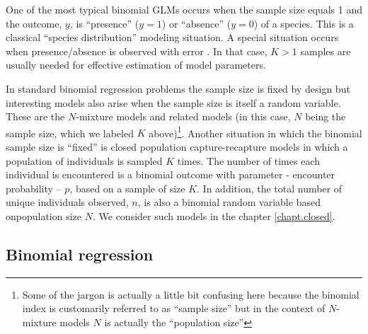 One of the most typical binomial GLMs occurs when the sample size
equals 1 and the outcome, $y$, is ``presence'' ($y=1$) or ``absence''
($y=0$) of a species. This is a classical ``species distribution''
modeling situation. A special situation occurs when presence/absence
is observed with error \citep{mackenzie_etal:2002,tyre_etal:2003}.
In that case, $K>1$ samples
are usually needed for effective estimation of model parameters.

 In standard binomial regression problems the sample size
is fixed by design but interesting models also arise when the sample
size is itself a random variable. These are the $N$-mixture models
\citep{royle:2004, kery_etal:2005, royle_dorazio:2008, kery:2010}
and related models (in this case, $N$ being the sample size,
which we labeled $K$ above)\footnote{Some of the jargon is actually a little
bit confusing here
because the binomial index is customarily referred to as ``sample size''
but in the context of $N$-mixture models $N$ is actually the
``population size''}.
Another
situation in which the binomial sample size is ``fixed'' is closed
population capture-recapture models in which a population of
individuals is sampled $K$ times.  The number of times each individual
is encountered is a binomial outcome with parameter - encounter
probability -- $p$, based on a sample of size $K$.  In addition, the
total number of unique individuals observed, $n$, is also a binomial
random variable based onpopulation size $N$.  We consider such
models in the chapter \ref{chapt.closed}.


\subsection{Binomial regression}

